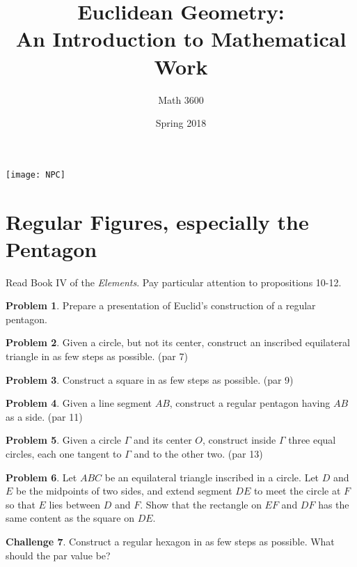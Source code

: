 \documentclass{tufte-handout}
\title{Euclidean Geometry:\\An Introduction to Mathematical Work}
\author[]{Math 3600}
\date{Spring 2018}
\theoremstyle{definition}
\newtheorem{problem}{Problem}[section]
\newtheorem{challenge}[problem]{Challenge}
\begin{document}
\maketitle

\begin{marginfigure}
    \texttt{[image: NPC]}
\end{marginfigure}

\setcounter{section}{15}
\section{Regular Figures, especially the Pentagon}

Read Book IV of the \emph{Elements}. Pay particular attention to propositions 10-12.

\begin{problem}\label{prob:GSP-reg-pentagon}
Prepare a presentation of Euclid's construction of a regular pentagon.
\end{problem}

\begin{problem}\label{prob:circle-inscribe-triangle} Given a circle, but not its center, construct an inscribed equilateral triangle in as few steps as possible. (par 7)
\end{problem}

\begin{problem}\label{prob:square}
Construct a square in as few steps as possible. (par 9)
\end{problem}

\begin{problem}\label{prob:side-reg-pent}
Given a line segment $AB$, construct a regular pentagon having $AB$ as a side. (par 11)
\end{problem}

\begin{problem}\label{prob:circle-three-tangent-circles}
Given a circle $\Gamma$ and its center $O$, construct inside $\Gamma$ three equal circles, each one tangent to $\Gamma$ and to the other two. (par 13)
\end{problem}

\begin{problem}\label{prob:inscribed-circle-content}
Let $ABC$ be an equilateral triangle inscribed in a circle. Let $D$ and $E$ be the midpoints of two sides, and extend segment $DE$ to meet the circle at $F$ so that $E$ lies between $D$ and $F$. Show that the rectangle on $EF$ and $DF$ has the same content as the square on $DE$.
\end{problem}


\begin{challenge}\label{chal:hexagon}
Construct a regular hexagon in as few steps as possible. What should the par value be?
\end{challenge}

\vfill
\end{document}
